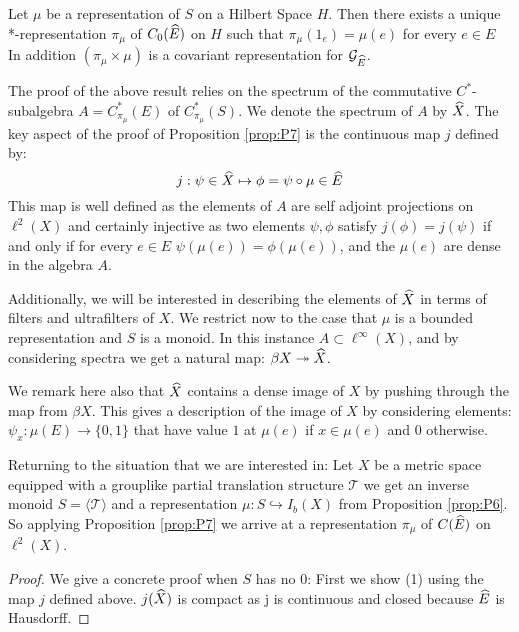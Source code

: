 \begin{corollary}
\begin{proposition}\label{prop:P7} 
Let $\mu$ be a representation of $S$ on a Hilbert Space $H$. Then there exists a unique *-representation $\pi_{\mu}$ of $C_{0}(\widehat{E})$ on $H$ such that $\pi_{\mu}(1_{e})=\mu(e)$ for every $e \in E$ In addition $(\pi_{\mu} \times \mu)$ is a covariant representation for $\mathcal{G}_{\widehat{E}}$. 
\end{proposition}

The proof of the above result relies on the spectrum of the commutative $C^{*}$-subalgebra $A=C^{*}_{\pi_{\mu}}(E)$ of $C^{*}_{\pi_{\mu}}(S)$. We denote the spectrum of $A$ by $\widehat{X}$. The key aspect of the proof of Proposition \ref{prop:P7} is the continuous map $j$ defined by: 
\begin{equation*}
j: \psi \in \widehat{X} \mapsto \phi = \psi \circ \mu \in \widehat{E}
\end{equation*}
This map is well defined as the elements of $A$ are self adjoint projections on $\ell^{2}(X)$ and certainly injective as two elements $\psi, \phi$ satisfy $j(\phi) = j(\psi)$ if and only if for every $e\in E$ $\psi(\mu(e))=\phi(\mu(e))$, and the $\mu(e)$ are dense in the algebra $A$.

Additionally, we will be interested in describing the elements of $\widehat{X}$ in terms of filters and ultrafilters of $X$. We restrict now to the case that $\mu$ is a bounded representation and $S$ is a monoid. In this instance $A \subset \ell^{\infty}(X)$, and by considering spectra we get a natural map: $\beta X \twoheadrightarrow \widehat{X}$.

We remark here also that $\widehat{X}$ contains a dense image of $X$ by pushing through the map from $\beta X$. This gives a description of the image of $X$ by considering elements: $\psi_{x}: \mu(E) \rightarrow \lbrace 0,1\rbrace$ that have value $1$ at $\mu(e)$ if $x \in \mu(e)$ and $0$ otherwise.

Returning to the situation that we are interested in: Let $X$ be a metric space equipped with a grouplike partial translation structure $\mathcal{T}$ we get an inverse monoid $S=\langle \mathcal{T} \rangle$ and a representation $\mu: S \hookrightarrow I_{b}(X)$ from Proposition \ref{prop:P6}. So applying Proposition \ref{prop:P7} we arrive at a representation $\pi_{\mu}$ of $C(\widehat{E})$ on $\ell^{2}(X)$. 

\begin{proof}
We give a concrete proof when $S$ has no 0: First we show (1) using the map $j$ defined above. $j(\widehat{X})$ is compact as j is continuous and closed because $\widehat{E}$ is Hausdorff.


\end{proof}
\end{corollary}
